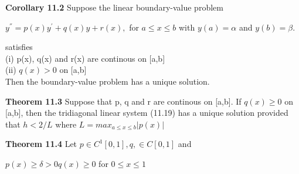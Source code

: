 \documentclass{article}
\newcommand\tab[1][1cm]{\hspace*{#1}}
\begin{document}
\textbf {Corollary 11.2} Suppose the linear boundary-value problem
\begin{center}
$ y^{''} = p(x) y^{'} + q(x)y + r(x),$  for $a \leq x \leq b$ with $y(a) = \alpha$ and $y(b) = \beta$.
\end{center}
satisfies \\
(i) p(x), q(x) and r(x) are continous on [a,b] \\
(ii) $q(x) > 0$ on [a,b] \\
Then the boundary-value problem has a unique solution.

\textbf {Theorem 11.3} Suppose that p, q and r are continous on [a,b]. If $q(x) \geq 0$ on [a,b], then the tridiagonal linear system (11.19) has a unique solution provided that $h < 2/L$ where $L = {max}_{a \leq x \leq b} |p(x)|$

\textbf {Theorem 11.4} Let $p \in C^1 [0,1], q, \in C[0,1]$ and 
\begin{center}
$p(x) \geq \delta > 0$\tab $q(x) \geq 0$ \tab  for $0 \leq x \leq 1$
\end{center}
\end{document}
